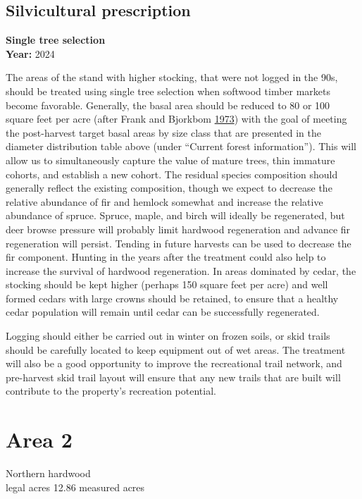 \documentclass[]{tufte-handout}
\begin{document}
\subsection{Silvicultural
prescription}\label{silvicultural-prescription}

\textbf{Single tree selection}\\
\noindent \textbf{Year:} 2024

The areas of the stand with higher stocking, that were not logged in the
90s, should be treated using single tree selection when softwood timber
markets become favorable. Generally, the basal area should be reduced to
80 or 100 square feet per acre (after Frank and Bjorkbom
\protect\hyperlink{ref-frank_silvicultural_1973}{1973}) with the goal of
meeting the post-harvest target basal areas by size class that are
presented in the diameter distribution table above (under ``Current
forest information''). This will allow us to simultaneously capture the
value of mature trees, thin immature cohorts, and establish a new
cohort. The residual species composition should generally reflect the
existing composition, though we expect to decrease the relative
abundance of fir and hemlock somewhat and increase the relative
abundance of spruce. Spruce, maple, and birch will ideally be
regenerated, but deer browse pressure will probably limit hardwood
regeneration and advance fir regeneration will persist. Tending in
future harvests can be used to decrease the fir component. Hunting in
the years after the treatment could also help to increase the survival
of hardwood regeneration. In areas dominated by cedar, the stocking
should be kept higher (perhaps 150 square feet per acre) and well formed
cedars with large crowns should be retained, to ensure that a healthy
cedar population will remain until cedar can be successfully
regenerated. \par Logging should either be carried out in winter on
frozen soils, or skid trails should be carefully located to keep
equipment out of wet areas. The treatment will also be a good
opportunity to improve the recreational trail network, and pre-harvest
skid trail layout will ensure that any new trails that are built will
contribute to the property's recreation potential.

\newpage

\section{Area 2}\label{area-2}

Northern hardwood\\
 legal acres \textbar{} 12.86 measured acres
\end{document}
